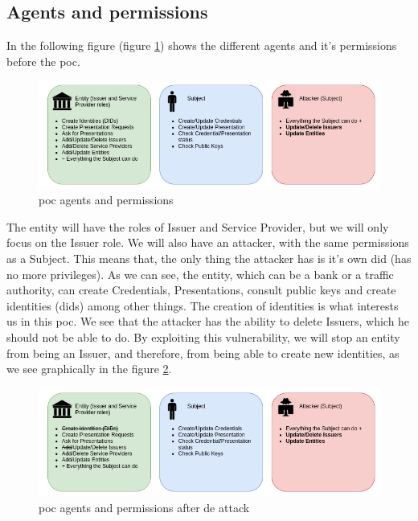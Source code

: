 \subsection{Agents and permissions}
In the following figure (figure \ref{fig:poc-actors}) shows the different agents and it's permissions before the \acrshort{poc}.\\
\begin{figure}[h]
    \centering
    \includegraphics[width=1.0\textwidth]{images/PoC/poc-actors.png}
    \caption{\acrshort{poc} agents and permissions}
    \label{fig:poc-actors}
\end{figure}

The entity will have the roles of Issuer and Service Provider, but we will only focus on the Issuer role. We will also have an attacker, with the same permissions as a Subject. This means that, the only thing the attacker has is it's own \acrshort{did} (has no more privileges). As we can see, the entity, which can be a bank or a traffic authority, can create Credentials, Presentations, consult public keys and create identities (\acrshort{did}s) among other things. The creation of identities is what interests us in this \acrshort{poc}. We see that the attacker has the ability to delete Issuers, which he should not be able to do. By exploiting this vulnerability, we will stop an entity from being an Issuer, and therefore, from being able to create new identities, as we see graphically in the figure \ref{fig:poc-actors-after}.

\begin{figure}[h]
    \centering
    \includegraphics[width=1.1\textwidth]{images/PoC/poc-actors-after.png}
    \caption{\acrshort{poc} agents and permissions after de attack}
    \label{fig:poc-actors-after}
\end{figure}
